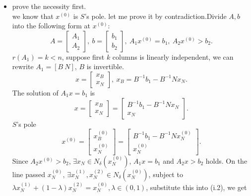 \documentclass[paper=a4, fontsize=11pt]{scrartcl} %
\numberwithin{equation}{section} %
\numberwithin{figure}{section} %
\numberwithin{table}{section} %
\begin{document}
\begin{itemize}
\item prove the necessity first.\\
we know that $x^{(0)}$ is $S$'s pole. let me prove it by contradiction.Divide $A,b$ into the following form at $x^{(0)}$:
\begin{equation}  \nonumber
A = \begin{bmatrix} A_1 \\ A_2 \end{bmatrix}, \ b = \begin{bmatrix} b_1 \\ b_2 \end{bmatrix}, \ A_1x^{(0)} = b_1,\ A_2x^{(0)} > b_2.
\end{equation}
$r(A_1)= k < n$, suppose first $k$ columns is linearly independent, we can rewrite $A_1 = [B \ N]$, $B$ is invertible.
\begin{equation}  \nonumber
x = \begin{bmatrix} x_B \\ x_N \end{bmatrix}, \ x_B = B^{-1}b_1 - B^{-1}Nx_N.
\end{equation}
The solution of $A_1x=b_1$ is
\begin{equation}
x = \begin{bmatrix} x_B \\ x_N \end{bmatrix} = \begin{bmatrix} B^{-1}b_1-B^{-1}Nx_N \\ x_N \end{bmatrix}.
\end{equation}
$S$'s pole
\begin{equation}
x^{(0)} = \begin{bmatrix} x^{(0)}_B \\ x^{(0)}_N \end{bmatrix} = \begin{bmatrix} B^{-1}b_1-B^{-1}Nx^{(0)}_N \\ x^{(0)}_N \end{bmatrix}.
\end{equation}
Since $ A_2x^{(0)} > b_2$, $\exists x_N \in N_{\delta}(x^{(0)}_N)$, $A_1x=b_1$ and $A_2x>b_2$ holds. On the line passed $x^{(0)}_N$, $\exists x^{(1)}_N, x^{(2)}_N \in N_{\delta}(x^{(0)}_N)$, subject to $\lambda x^{(1)}_N+(1-\lambda)x^{(2)}_N = x^{(0)}_N, \lambda \in (0,1)$, substitute this into (i.2), we get
\begin{equation}
\begin{array}{rcl}

\end{array}
\end{equation}
\end{itemize}
\end{document}
